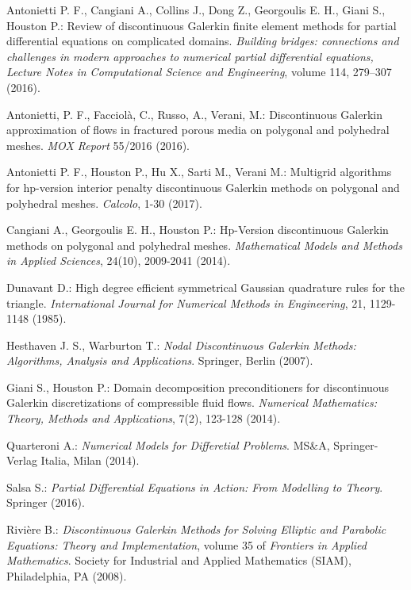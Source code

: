 \documentclass[12pt, a4paper]{article}
\theoremstyle{definition}
\theoremstyle{plain}
\theoremstyle{plain}
\begin{document}
\begin{thebibliography}{99}
	Antonietti P. F., Cangiani  A., Collins J., Dong Z., Georgoulis E. H., Giani S., Houston P.: Review of discontinuous Galerkin finite element methods for partial differential equations on complicated domains. \emph{Building bridges: connections and challenges in modern approaches to numerical partial differential equations, Lecture Notes in Computational Science and Engineering}, volume 114, 279–307 (2016).
	
	Antonietti, P. F., Facciolà, C., Russo, A., Verani, M.: Discontinuous Galerkin approximation of flows in fractured porous media on polygonal and polyhedral meshes. \emph{MOX Report} 55/2016 (2016).
	
	Antonietti P. F., Houston  P., Hu  X., Sarti  M., Verani M.: Multigrid algorithms for hp-version interior penalty discontinuous Galerkin methods on polygonal and	polyhedral meshes. \emph{Calcolo}, 1-30 (2017).
	
	Cangiani A., Georgoulis E. H., Houston P.: Hp-Version discontinuous Galerkin methods on polygonal and polyhedral meshes. \emph{Mathematical Models and Methods in Applied Sciences}, 24(10), 2009-2041 (2014).
	
	Dunavant D.: High degree efficient symmetrical Gaussian quadrature rules for the triangle. \emph{International Journal for Numerical Methods in Engineering}, 21, 1129-1148 (1985).
	
	Hesthaven J. S., Warburton T.: \emph{Nodal Discontinuous Galerkin Methods: Algorithms, Analysis and Applications}. Springer, Berlin (2007).
	
	Giani S., Houston P.: Domain decomposition preconditioners for discontinuous Galerkin discretizations of compressible fluid flows. \emph{Numerical Mathematics: Theory, Methods and Applications}, 7(2), 123-128 (2014).
	
	Quarteroni A.: \emph{Numerical Models for Differetial Problems}. MS\&A, Springer-Verlag Italia, Milan (2014).
	
	Salsa S.: \emph{Partial Differential Equations in Action: From Modelling to Theory}. Springer (2016).
	
	Rivière B.: \emph{Discontinuous Galerkin Methods for Solving Elliptic and Parabolic Equations: Theory and Implementation}, volume 35 of \emph{Frontiers in Applied Mathematics}. Society for Industrial and Applied Mathematics (SIAM), Philadelphia, PA (2008).
\end{thebibliography}
\end{document}

